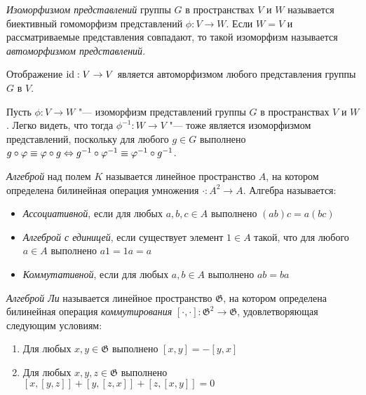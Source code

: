 \begin{definition}
	\textit{Изоморфизмом представлений} группы $G$ в пространствах $V$ и $W$ называется биективный гомоморфизм представлений $\phi : V \to W$. Если $W = V$ и рассматриваемые представления совпадают, то такой изоморфизм называется \textit{автоморфизмом представлений}.
\end{definition}

\begin{example}
	Отображение $\mathrm{id} : V \to V$ является автоморфизмом любого представления группы $G$ в $V$.
\end{example}

\begin{note}
	Пусть $\phi : V \to W$ "--- изоморфизм представлений группы $G$ в пространствах $V$ и $W$. Легко видеть, что тогда $\phi^{-1} : W \to V$ "--- тоже является изоморфизмом представлений, поскольку для любого $g \in G$ выполнено $g\circ\varphi \equiv \varphi \circ g \Leftrightarrow g^{-1}\circ\varphi^{-1} \equiv \varphi^{-1}\circ g^{-1}$.
\end{note}

\begin{definition}
	\textit{Алгеброй} над полем $K$ называется линейное пространство $A$, на котором определена билинейная операция умножения $\cdot : A^2 \to A$. Алгебра называется:
	\begin{itemize}
		\item \textit{Ассоциативной}, если для любых $a, b, c \in A$ выполнено $(ab)c = a(bc)$
		\item \textit{Алгеброй с единицей}, если существует элемент $1 \in A$ такой, что для любого $a \in A$ выполнено $a1 = 1a = a$
		\item \textit{Коммутативной}, если для любых $a, b \in A$ выполнено $ab = ba$
	\end{itemize}
\end{definition}

\begin{definition}
	\textit{Алгеброй Ли} называется линейное пространство $\mathfrak G$, на котором определена билинейная операция \textit{коммутирования} $[\cdot,\cdot] : \mathfrak G^2 \to \mathfrak G$, удовлетворяющая следующим условиям:
	\begin{enumerate}
		\item Для любых $x, y \in \mathfrak G$ выполнено $[x, y] = -[y, x]$
		\item Для любых $x, y, z \in \mathfrak G$ выполнено $[x, [y, z]] + [y, [z, x]] + [z, [x, y]] = 0$
	\end{enumerate}
\end{definition}

